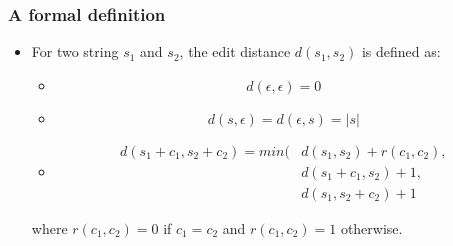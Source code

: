 \documentclass[svgnames]{beamer}
\begin{document}
\begin{frame} \frametitle{A formal definition}
  
  \begin{block}{}
    \begin{itemize}
    \item For two string $s_1$ and $s_2$, the edit distance $d(s_1,s_2)$ is
      defined as:
      \begin{itemize}
      \item
        \begin{displaymath}
          d(\epsilon,\epsilon) = 0
        \end{displaymath}
      \item
        \begin{displaymath}
          d(s,\epsilon) = d(\epsilon,s) = |s|
        \end{displaymath}
      \item
        \begin{displaymath}
          \begin{split}
            d(s_1+c_1,s_2+c_2) = min(&d(s_1,s_2)+r(c_1,c_2), \\
            & d(s_1+c_1,s_2) + 1, \\
            & d(s_1,s_2+c_2) + 1
          \end{split}
        \end{displaymath}
      \end{itemize}
      where $r(c_1,c_2) = 0$ if $c_1=c_2$ and $r(c_1,c_2) = 1$ otherwise.
    \end{itemize}
  \end{block}

\end{frame}

\end{document}
